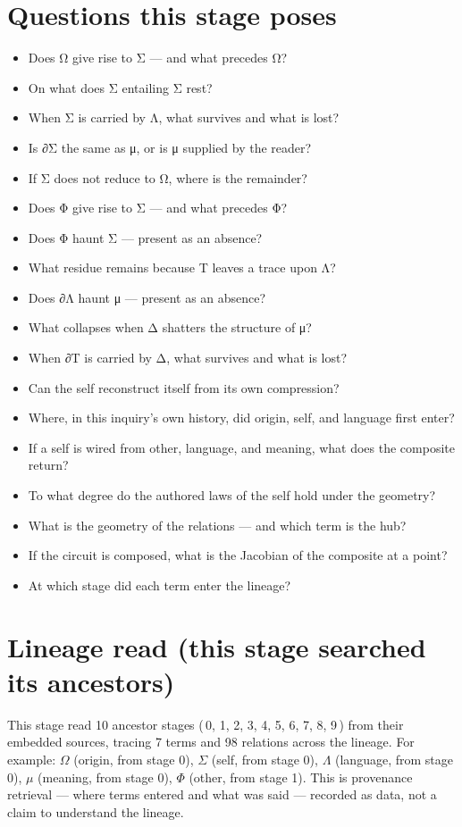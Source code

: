 \documentclass[11pt]{article}
\begin{document}
\section*{Questions this stage poses}\begin{itemize}\item Does Ω give rise to Σ — and what precedes Ω?
\item On what does Σ entailing Σ rest?
\item When Σ is carried by Λ, what survives and what is lost?
\item Is ∂Σ the same as μ, or is μ supplied by the reader?
\item If Σ does not reduce to Ω, where is the remainder?
\item Does Φ give rise to Σ — and what precedes Φ?
\item Does Φ haunt Σ — present as an absence?
\item What residue remains because Τ leaves a trace upon Λ?
\item Does ∂Λ haunt μ — present as an absence?
\item What collapses when Δ shatters the structure of μ?
\item When ∂Τ is carried by Δ, what survives and what is lost?
\item Can the self reconstruct itself from its own compression?
\item Where, in this inquiry's own history, did origin, self, and language first enter?
\item If a self is wired from other, language, and meaning, what does the composite return?
\item To what degree do the authored laws of the self hold under the geometry?
\item What is the geometry of the relations — and which term is the hub?
\item If the circuit is composed, what is the Jacobian of the composite at a point?
\item At which stage did each term enter the lineage?\end{itemize}
\section*{Lineage read (this stage searched its ancestors)}This stage read 10 ancestor stages (\,0, 1, 2, 3, 4, 5, 6, 7, 8, 9\,) from their embedded sources, tracing 7 terms and 98 relations across the lineage. For example: $ \Omega $ (origin, from stage 0), $ \Sigma $ (self, from stage 0), $ \Lambda $ (language, from stage 0), $ \mu $ (meaning, from stage 0), $ \Phi $ (other, from stage 1). This is provenance retrieval --- where terms entered and what was said --- recorded as data, not a claim to understand the lineage.
\end{document}
